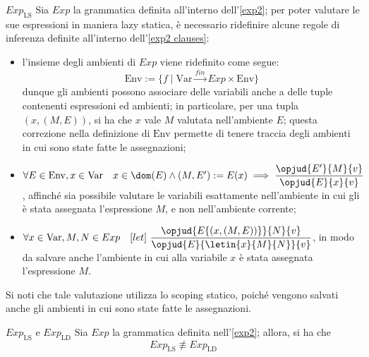 \documentclass[a4paper, 12pt]{report}
\begin{document}
    \begin{framedprop}{$Exp_\mathrm{LS}$}
        Sia $Exp$ la grammatica definita all'interno dell'\cref{exp2}; per poter valutare le sue espressioni in maniera lazy statica, è necessario ridefinire alcune regole di inferenza definite all'interno dell'\cref{exp2 clauses}:

        \begin{itemize}
            \item l'insieme degli ambienti di $Exp$ viene ridefinito come segue: $$\mathrm{Env} := \{f \mid \mathrm{Var} \xrightarrow{fin} Exp \times \mathrm{Env} \}$$ dunque gli ambienti possono associare delle variabili anche a delle tuple contenenti espressioni ed ambienti; in particolare, per una tupla $(x, (M, E))$, si ha che $x$ vale $M$ valutata nell'ambiente $E$; questa correzione nella definizione di $\mathrm{Env}$ permette di tenere traccia degli ambienti in cui sono state fatte le assegnazioni;
            \item $\forall E \in \mathrm{Env}, x \in \mathrm{Var} \quad x \in \dom(E) \land (M, E') := E(x) \implies \dfrac{\opjud{E'}{M}{v}}{\opjud{E}{x}{v}}$, affinché sia possibile valutare le variabili esattamente nell'ambiente in cui gli è stata assegnata l'espressione $M$, e non nell'ambiente corrente;
            \item $\forall x \in \mathrm{Var}, M, N \in Exp \quad [let] \ \dfrac{\opjud{E\{(x, (M, E))\}}{N}{v}}{\opjud{E}{\letin{x}{M}{N}}{v}}$, in modo da salvare anche l'ambiente in cui alla variabile $x$ è stata assegnata l'espressione $M$.
        \end{itemize}

        Si noti che tale valutazione utilizza lo scoping statico, poiché vengono salvati anche gli ambienti in cui sono state fatte le assegnazioni.
    \end{framedprop}

    \begin{framedlem}{$Exp_\mathrm{LS}$ e $Exp_\mathrm{LD}$}
        Sia $Exp$ la grammatica definita nell'\cref{exp2}; allora, si ha che $$Exp_\mathrm{LS} \not\equiv Exp_\mathrm{LD}$$
    \end{framedlem}
\end{document}

